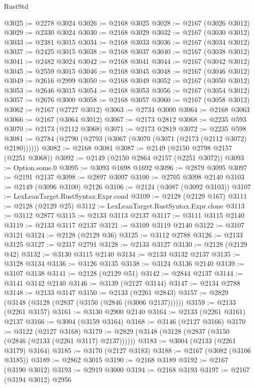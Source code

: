 \begin{lexlean}{RustStd}
\begin{coremodule}
{\begin{coremodule}
{{{{{{{{{{{{{{{{@3025 := @2278 @3024
@3026 := @2168 @3025
@3028 := @2167 (@3026 @3012)
@3029 := @2330 @3024
@3030 := @2168 @3029
@3032 := @2167 (@3030 @3012)
@3033 := @2381 @3015
@3034 := @2168 @3033
@3036 := @2167 (@3034 @3012)
@3037 := @2425 @3015
@3038 := @2168 @3037
@3040 := @2167 (@3038 @3012)
@3041 := @2482 @3024
@3042 := @2168 @3041
@3044 := @2167 (@3042 @3012)
@3045 := @2559 @3015
@3046 := @2168 @3045
@3048 := @2167 (@3046 @3012)
@3049 := @2616 @2999
@3050 := @2168 @3049
@3052 := @2167 (@3050 @3012)
@3053 := @2646 @3015
@3054 := @2168 @3053
@3056 := @2167 (@3054 @3012)
@3057 := @2676 @3000
@3058 := @2168 @3057
@3060 := @2167 (@3058 @3012)
@3062 := @2167 (@2727 @3012)
@3063 := @2734 @3000
@3064 := @2168 @3063
@3066 := @2167 (@3064 @3012)
@3067 := @2173 @2812
@3068 := @2235 @593
@3070 := @2173 (@2112 @3068)
@3071 := @2173 @2819
@3072 := @2235 @598
@3081 := @2784 (@2790 (@2793 (@3067 (@3070 (@3071 (@2173 (@2112 @3072) @2180))))))
@3082 := @2168 @3081
@3087 := @2149 (@2150 @2798 @2157 (@2251 @3068))
@3092 := @2149 (@2150 @2864 @2157 (@2251 @3072))
@3093 := Option.some.{0}
@3095 := @3093 @1698 @1692
@3096 := @2879 @3095
@3097 := @2191 @2137
@3098 := @2897 @3097
@3100 := @2705 @3098 @2140
@3103 := @2149 (@3096 @3100) @2126
@3106 := @2124 (@3087 (@3092 @3103))
@3107 := LexLeanTarget.RustSyntax.Expr.cond
@3109 := @2128 (@2129 @167)
@3111 := @2128 (@2129 @25)
@3112 := LexLeanTarget.RustSyntax.Expr.clone
@3113 := @3112 @2877
@3115 := @2133 @3113 @2137
@3117 := @3111 @3115 @2140
@3119 := @2133 @3117 @2137
@3121 := @3109 @3119 @2140
@3122 := @3107 @3121
@3124 := @2128 (@2129 @36)
@3125 := @3112 @2788
@3126 := @2133 @3125
@3127 := @2317 @2791
@3128 := @2133 @3127
@3130 := @2128 (@2129 @42)
@3132 := @3130 @3115 @2140
@3134 := @2133 @3132 @2137
@3135 := @3128 @3134
@3136 := @3126 @3135
@3138 := @3124 @3136 @2140
@3139 := @3107 @3138
@3141 := @2128 (@2129 @51)
@3142 := @2844 @2137
@3144 := @3141 @3142 @2140
@3146 := @3139 (@2127 @3144)
@3147 := @2134 @2788
@3148 := @2133 @3147
@3150 := @2133 (@2261 @2843)
@3157 := @2829 (@3148 (@3128 (@2837 (@3150 (@2846 (@3006 @2137))))))
@3159 := @2133 (@2261 @3157)
@3161 := @3130 @2900 @2140
@3164 := @2133 (@2261 @3161) @2137
@3166 := @3004 (@3159 @3164)
@3168 := @3146 (@2127 @3166)
@3170 := @3122 (@2127 @3168)
@3179 := @2829 (@3148 (@3128 (@2837 (@3150 (@2846 (@2133 (@2261 @3117) @2137))))))
@3183 := @3004 (@2133 (@2261 @3179) @3164)
@3185 := @3170 (@2127 @3183)
@3188 := @2167 (@3082 (@3106 @3185))
@3189 := @2862 @3015
@3190 := @2168 @3189
@3192 := @2167 (@3190 @3012)
@3193 := @2919 @3000
@3194 := @2168 @3193
@3197 := @2167 (@3194 @3012) @2956
}}}}}}}}}}}}}}}}
\end{coremodule}}
\end{coremodule}
\end{lexlean}

